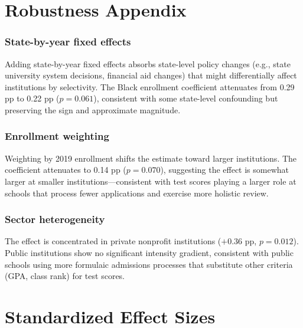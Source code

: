 \documentclass[12pt]{article}
\begin{document}
\section{Robustness Appendix}
\label{app:robust}

\subsubsection*{State-by-year fixed effects} Adding state-by-year fixed effects absorbs state-level policy changes (e.g., state university system decisions, financial aid changes) that might differentially affect institutions by selectivity. The Black enrollment coefficient attenuates from 0.29 pp to 0.22 pp ($p = 0.061$), consistent with some state-level confounding but preserving the sign and approximate magnitude.

\subsubsection*{Enrollment weighting} Weighting by 2019 enrollment shifts the estimate toward larger institutions. The coefficient attenuates to 0.14 pp ($p = 0.070$), suggesting the effect is somewhat larger at smaller institutions---consistent with test scores playing a larger role at schools that process fewer applications and exercise more holistic review.

\subsubsection*{Sector heterogeneity} The effect is concentrated in private nonprofit institutions ($+0.36$ pp, $p = 0.012$). Public institutions show no significant intensity gradient, consistent with public schools using more formulaic admissions processes that substitute other criteria (GPA, class rank) for test scores.

\section{Standardized Effect Sizes}
\label{sec:sde}


\end{document}
